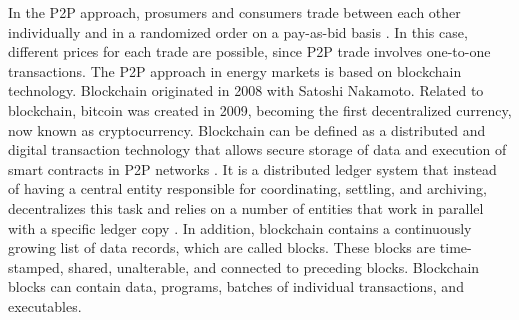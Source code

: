 In the P2P approach, prosumers and consumers trade between each other individually and in a randomized order on a pay-as-bid basis \cite{mengelkamp2018blockchain}. In this case, different prices for each trade are possible, since P2P trade involves one-to-one transactions. The P2P approach in energy markets is based on blockchain technology. Blockchain originated in 2008 with Satoshi Nakamoto. Related to blockchain, bitcoin was created in 2009, becoming the first decentralized currency, now known as cryptocurrency. Blockchain can be defined as a distributed and digital transaction technology that allows secure storage of data and execution of smart contracts in P2P networks \cite{swan2015blockchain}. It is a distributed ledger system that instead of having a central entity responsible for coordinating, settling, and archiving, decentralizes this task and relies on a number of entities that work in parallel with a specific ledger copy \cite{Pinson2017}.
In addition, blockchain contains a continuously growing list of data records, which are called blocks. These blocks are time-stamped, shared, unalterable, and connected to preceding blocks. Blockchain blocks can contain data, programs, batches of individual transactions, and executables.

